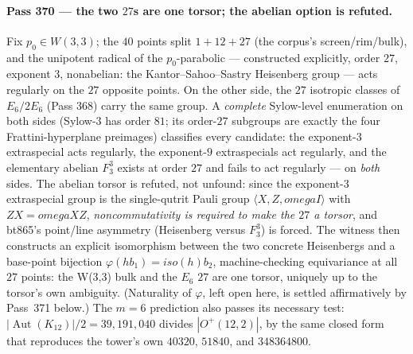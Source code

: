\documentclass[12pt,a4paper]{article}
\def\mathbb#1{#1}%
\def\mathrm#1{#1}%
\def\textbf#1{#1}%
\def\texttt#1{#1}%
\def\omega{omega}%
\def\cdot{ }%
\theoremstyle{definition}
\newcommand{\FF}{\mathbb{F}}
\begin{document}
\paragraph{Pass 370 --- the two $27$s are one torsor; the abelian option is
refuted.}
Fix $p_0\in W(3,3)$; the $40$ points split $1+12+27$ (the corpus's
screen/rim/bulk), and the unipotent radical of the $p_0$-parabolic ---
constructed explicitly, order $27$, exponent $3$, nonabelian: the
Kantor--Sahoo--Sastry Heisenberg group --- acts \textbf{regularly on the $27$
opposite points}.  On the other side, the $27$ isotropic classes of $E_6/2E_6$
(Pass 368) carry the same group.  A \emph{complete} Sylow-level enumeration on
both sides (Sylow-$3$ has order $81$; its order-$27$ subgroups are exactly the
four Frattini-hyperplane preimages) classifies every candidate:
the exponent-$3$ extraspecial acts regularly, the exponent-$9$ extraspecials
act regularly, and \textbf{the elementary abelian $\FF_3^3$ exists at order
$27$ and fails to act regularly} --- on \emph{both} sides.  The abelian torsor
is refuted, not unfound: since the exponent-$3$ extraspecial group is the
single-qutrit Pauli group $\langle X,Z,\omega I\rangle$ with $ZX=\omega XZ$,
\emph{noncommutativity is required to make the $27$ a torsor}, and
\texttt{bt865}'s point/line asymmetry (Heisenberg versus $\FF_3^3$) is forced.
The witness then constructs an explicit isomorphism between the two concrete
Heisenbergs and a base-point bijection
$\varphi(h\cdot b_1)=\mathrm{iso}(h)\cdot b_2$, machine-checking equivariance
at all $27$ points: \textbf{the W(3,3) bulk and the $E_6$ $27$ are one torsor},
uniquely up to the torsor's own ambiguity.  (Naturality of $\varphi$, left open
here, is settled affirmatively by Pass~371 below.)  The $m=6$ prediction also passes its
necessary test: $|\!\operatorname{Aut}(K_{12})|/2=39{,}191{,}040$ divides
$|O^+(12,2)|$, by the same closed form that reproduces the tower's own
$40320$, $51840$, and $348364800$.
\end{document}

